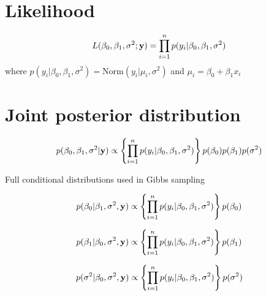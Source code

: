 \documentclass[12pt]{article}
\begin{document}
\section{Likelihood}

\[
  L(\beta_0,\beta_1,\sigma^2; {\bf y}) = \prod_{i=1}^n p(y_i|\beta_0,\beta_1,\sigma^2)
\]
where $p(y_i|\beta_0,\beta_1,\sigma^2) = \mathrm{Norm}(y_i|\mu_i,\sigma^2)$ and $\mu_i = \beta_0 + \beta_1x_i$


\section{Joint posterior distribution}


\[
  p(\beta_0,\beta_1,\sigma^2 | {\bf y}) \propto \left\{\prod_{i=1}^n p(y_i|\beta_0,\beta_1,\sigma^2)\right\}p(\beta_0)p(\beta_1)p(\sigma^2)
\]


Full conditional distributions used in Gibbs sampling


\[
  p(\beta_0|\beta_1,\sigma^2,{\bf y}) \propto \left\{\prod_{i=1}^n p(y_i|\beta_0,\beta_1,\sigma^2)\right\}p(\beta_0)
\]


\[
  p(\beta_1|\beta_0,\sigma^2,{\bf y}) \propto \left\{\prod_{i=1}^n p(y_i|\beta_0,\beta_1,\sigma^2)\right\}p(\beta_1)
\]

\[
  p(\sigma^2|\beta_0,\sigma^2,{\bf y}) \propto \left\{\prod_{i=1}^n p(y_i|\beta_0,\beta_1,\sigma^2)\right\}p(\sigma^2)
\]
\end{document}
